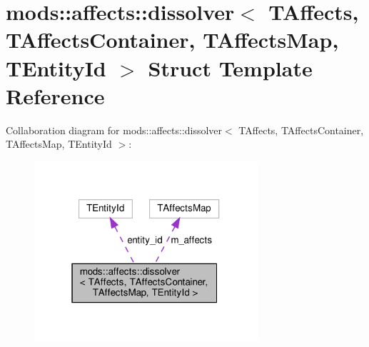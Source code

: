 \hypertarget{structmods_1_1affects_1_1dissolver}{}\section{mods\+:\+:affects\+:\+:dissolver$<$ T\+Affects, T\+Affects\+Container, T\+Affects\+Map, T\+Entity\+Id $>$ Struct Template Reference}
\label{structmods_1_1affects_1_1dissolver}


Collaboration diagram for mods\+:\+:affects\+:\+:dissolver$<$ T\+Affects, T\+Affects\+Container, T\+Affects\+Map, T\+Entity\+Id $>$\+:
\nopagebreak
\begin{figure}[H]
\begin{center}
\leavevmode
\includegraphics[width=235pt]{structmods_1_1affects_1_1dissolver__coll__graph}
\end{center}
\end{figure}
